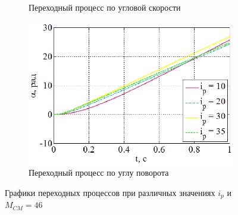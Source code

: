 \documentclass[a4paper,12pt]{article} %
\begin{document}
\begin{figure}[H]
\begin{subfigure}[b]{0.48\textwidth}
		\caption{Переходный процесс по угловой скорости}
	\end{subfigure}
	\hfill
	\begin{subfigure}[b]{0.48\textwidth}
		\includegraphics[width = \textwidth]{scheme/A4}
		\caption{Переходный процесс по углу поворота}
	\end{subfigure}
	\caption{Графики переходных процессов при различных значениях $i_p$ и $M_{CM}=46$}
	\label{UIwa44}
\end{figure}

\newpage
\end{document}

